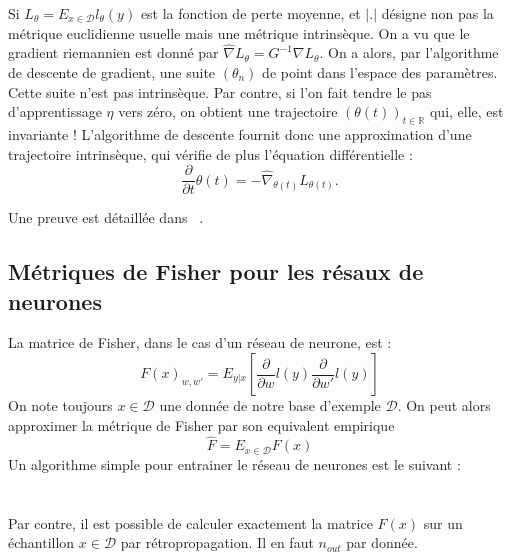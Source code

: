 \documentclass{article}
\theoremstyle{definition}
\newcommand{\R}{\mathbb R}
\begin{document}
Si $L_\theta=E_{x\in \mathcal D}l_\theta(y)$ est la fonction de perte moyenne, et $|.|$ désigne non pas la métrique euclidienne usuelle mais une métrique intrinsèque. On a vu que le gradient riemannien est donné  par $\hat \nabla L_\theta = G^{-1}\nabla L_\theta$. On a alors, par l'algorithme de descente de gradient, une suite $(\theta_n)$ de point dans l'espace des paramètres. Cette suite n'est pas intrinsèque. Par contre, si l'on fait tendre le pas d'apprentissage $\eta$ vers zéro, on obtient une trajectoire $(\theta(t))_{t\in \R}$ qui, elle, est invariante ! L'algorithme de descente fournit donc une approximation d'une trajectoire intrinsèque, qui vérifie de plus l'équation différentielle :
\[\frac{\partial }{\partial t}\theta(t)=-\hat\nabla_{\theta(t)} L_{\theta(t)}.\]

Une preuve est détaillée dans ~\cite{Ollivier}.
 
\subsection{Métriques de Fisher pour les résaux de neurones}

La matrice de Fisher, dans le cas d'un réseau de neurone, est :
\[F(x)_{w,w'}=E_{y|x} \left[\frac{\partial }{\partial w}l(y)\frac{\partial }{\partial w'}l(y)\right]\]
On note toujours $x\in \mathcal D$ une donnée de notre base d'exemple $\mathcal D$. On peut alors approximer la métrique de Fisher par son equivalent empirique 
\[\hat F = E_{x\in \mathcal D} F(x)\]
Un algorithme simple pour entrainer le réseau de neurones est le suivant :\\

\\
\\

Par contre, il est possible de calculer exactement la matrice $F(x)$ sur un échantillon $x\in \mathcal D$ par rétropropagation. Il en faut $n_{out}$ par donnée.
\end{document}
